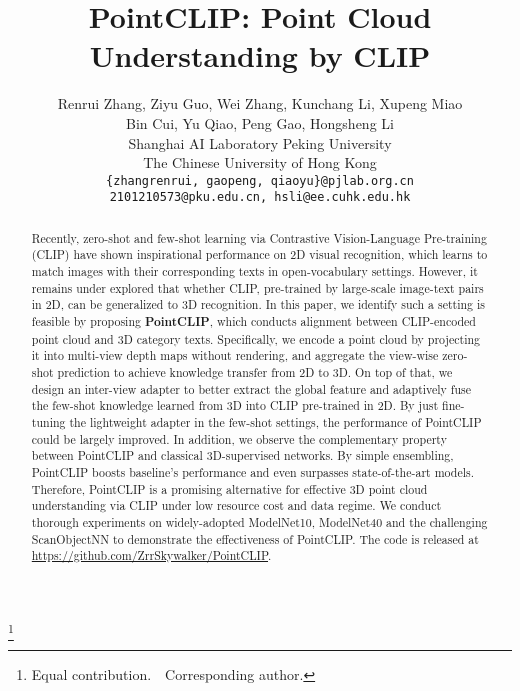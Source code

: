 \documentclass[10pt,twocolumn,letterpaper]{article}
\newcommand\blfootnote[1]{\begingroup
  \renewcommand\thefootnote{}\footnote{#1}\addtocounter{footnote}{-1}\endgroup
}
\begin{document}
\title{PointCLIP: Point Cloud Understanding by CLIP}



\author{Renrui Zhang, Ziyu Guo, Wei Zhang, Kunchang Li, Xupeng Miao \\ Bin Cui,  Yu Qiao, Peng Gao, Hongsheng Li\\ 
  Shanghai AI Laboratory \quad 
  Peking University\\
  The Chinese University of Hong Kong\\
\texttt{\{zhangrenrui, gaopeng, qiaoyu\}@pjlab.org.cn} \\
\texttt{2101210573@pku.edu.cn, hsli@ee.cuhk.edu.hk}
}



\maketitle
\blfootnote{ Equal contribution.\ \   Corresponding author.}
\begin{abstract}

    Recently, zero-shot and few-shot learning via Contrastive Vision-Language Pre-training (CLIP) have shown inspirational performance on 2D visual recognition, which learns to match images with their corresponding texts in open-vocabulary settings. 
However, it remains under explored that whether CLIP, pre-trained by large-scale image-text pairs in 2D, can be generalized to 3D recognition. In this paper, we identify such a setting is feasible by proposing \textbf{PointCLIP}, which conducts alignment between CLIP-encoded point cloud and 3D category texts. Specifically, we encode a point cloud by projecting it into multi-view depth maps without rendering, and aggregate the view-wise zero-shot prediction to achieve knowledge transfer from 2D to 3D. 
    On top of that, we design an inter-view adapter to better extract the global feature and adaptively fuse the few-shot knowledge learned from 3D into CLIP pre-trained in 2D. By just fine-tuning the lightweight adapter in the few-shot settings, the performance of PointCLIP could be largely improved. 
    In addition, we observe the complementary property between PointCLIP and classical 3D-supervised networks. By simple ensembling, PointCLIP boosts baseline's performance and even surpasses state-of-the-art models.
    Therefore, PointCLIP is a promising alternative for effective 3D point cloud understanding via CLIP under low resource cost and data regime. We conduct thorough experiments on widely-adopted ModelNet10, ModelNet40 and the challenging ScanObjectNN to demonstrate the effectiveness of PointCLIP. The code is released at \url{https://github.com/ZrrSkywalker/PointCLIP}.
   
\end{abstract}
\end{document}
